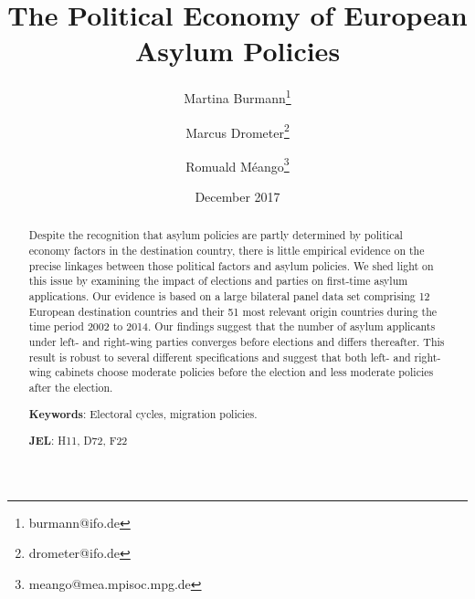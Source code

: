 \documentclass[a4paper,12pt]{article}
\title{The Political Economy of European Asylum Policies}
\date{December 2017}
\author[,1]{Martina Burmann\thanks{burmann@ifo.de}}
\author[,1]{Marcus Drometer\thanks{drometer@ifo.de}}
\author[,2]{Romuald M\'eango\thanks{meango@mea.mpisoc.mpg.de}}
\affil[1]{ifo Institute for Economic Research, Munich}
\affil[2]{Munich Center for the Economics of Aging (MEA)}
\begin{document}
      \maketitle

\begin{center}

\end{center}
\begin{abstract}
\singlespacing
\noindent 
Despite the recognition that asylum policies are partly determined by political economy factors in the destination country, there is little empirical evidence on the precise linkages between those political factors and asylum policies. We shed light on this issue by examining the impact of elections and parties on first-time asylum applications.  Our evidence is based on a large bilateral panel data set comprising 12 European destination countries and their 51 most relevant origin countries during the time period 2002 to 2014. Our findings suggest that  the number of asylum applicants under left- and right-wing parties converges before elections and differs thereafter. This result is robust to several different specifications and suggest that both left- and right-wing cabinets choose moderate policies before the election and less moderate policies after the election.


\bigskip

\textbf{Keywords}: Electoral cycles, migration policies.

\textbf{JEL}: H11, D72, F22

\bigskip
\end{abstract}
\setcounter{page}{0} \renewcommand{\thepage}{}
\pagebreak{}\pagebreak

\end{document}
